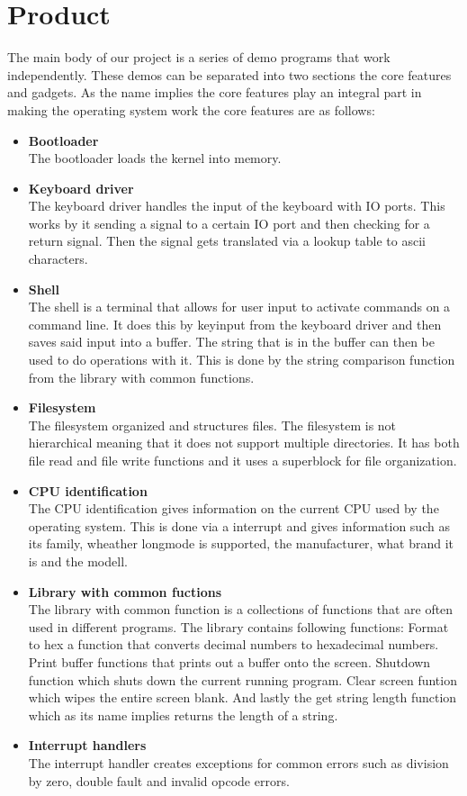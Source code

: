 \section{Product}

The main body of our project is a series of demo programs that work independently.
These demos can be separated into two sections the core features and gadgets.
As the name implies the core features play an integral part in making the operating
system work the core features are as follows:


\begin{itemize}

\item \textbf{Bootloader} \\
The bootloader loads the kernel into memory.
\item \textbf{Keyboard driver} \\
The keyboard driver handles the input of the keyboard with IO ports. This works
by it sending a signal to a certain IO port and then checking for a return signal.
Then the signal gets translated via a lookup table to ascii characters.
\item \textbf{Shell} \\
The shell is a terminal that allows for user input to activate commands on a command
line. It does this by keyinput from the keyboard driver and then saves said input
into a buffer. The string that is in the buffer can then be used to do operations with
it. This is done by the string comparison function from the library with common functions.
\item \textbf{Filesystem} \\
The filesystem organized and structures files. The filesystem is not hierarchical meaning
that it does not support multiple directories. It has both file read and file write functions
and it uses a superblock for file organization.
\item \textbf{CPU identification} \\
The CPU identification gives information on the current CPU used by the operating system.
This is done via a interrupt and gives information such as its family, wheather longmode is
supported, the manufacturer, what brand it is and the modell.
\item \textbf{Library with common fuctions} \\
The library with common function is a collections of functions that are often used in different
programs. The library contains following functions: Format to hex a function that converts decimal
numbers to hexadecimal numbers. Print buffer functions that prints out a buffer onto the screen. 
Shutdown function which shuts down the current running program. Clear screen funtion which wipes
the entire screen blank. And lastly the get string length function which as its name implies returns
the length of a string.
\item \textbf{Interrupt handlers} \\
The interrupt handler creates exceptions for common errors such as division by zero, double fault
and invalid opcode errors.


\end{itemize}

